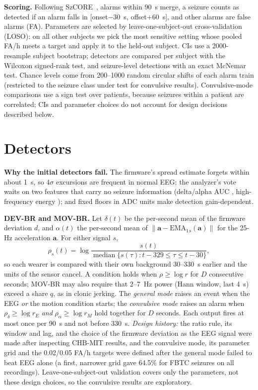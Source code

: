 \documentclass[conference,letterpaper]{IEEEtran}
\begin{document}
\textbf{Scoring.} Following SzCORE~\cite{dan2025szcore}, alarms within 90~s merge, a seizure counts as detected if an alarm falls in [onset$-$30~s, offset$+$60~s], and other alarms are false alarms (FA). Parameters are selected by leave-one-subject-out cross-validation (LOSO): on all other subjects we pick the most sensitive setting whose pooled FA/h meets a target and apply it to the held-out subject. CIs use a 2000-resample subject bootstrap; detectors are compared per subject with the Wilcoxon signed-rank test, and seizure-level detections with an exact McNemar test. Chance levels come from 200--1000 random circular shifts of each alarm train (restricted to the seizure class under test for convulsive results). Convulsive-mode comparisons use a sign test over patients, because seizures within a patient are correlated; CIs and parameter choices do not account for design decisions described below.

\section{Detectors}\label{sec:det}
\textbf{Why the initial detectors fail.} The firmware's spread estimate forgets within about 1~s, so 4$\sigma$ excursions are frequent in normal EEG; the analyzer's vote waits on two features that carry no seizure information (delta/alpha AUC \AucDAR{}, high-frequency energy \AucHFE{}); and fixed floors in ADC units make detection gain-dependent.

\textbf{DEV-BR and MOV-BR.} Let $\delta(t)$ be the per-second mean of the firmware deviation $d$, and $\alpha(t)$ the per-second mean of $\lVert \mathbf a - \mathrm{EMA}_{1\,\mathrm s}(\mathbf a)\rVert$ for the 25-Hz acceleration $\mathbf a$. For either signal $s$,
\begin{equation}
\rho_s(t) = \log \frac{s(t)}{\operatorname{median}\{s(\tau): t{-}329 \le \tau \le t{-}30\}},
\end{equation}
so each wearer is compared with their own background 30--330~s earlier and the units of the sensor cancel. A condition holds when $\rho \ge \log r$ for $D$ consecutive seconds; MOV-BR may also require that 2--7~Hz power (Hann window, last 4~s) exceed a share $q$, as in clonic jerking. The \emph{general mode} raises an event when the EEG \emph{or} the motion condition starts; the \emph{convulsive mode} raises an alarm when $\rho_\delta \ge \log r_E$ \emph{and} $\rho_\alpha \ge \log r_M$ hold together for $D$ seconds. Each output fires at most once per 90~s and not before 330~s. \emph{Design history:} the ratio rule, its window and lag, and the choice of the firmware deviation as the EEG signal were made after inspecting CHB-MIT results, and the convulsive mode, its parameter grid and the 0.02/0.05 FA/h targets were defined after the general mode failed to beat EEG alone (a first, narrower grid gave 64.5\% for FBTC seizures on all recordings). Leave-one-subject-out validation covers only the parameters, not these design choices, so the convulsive results are exploratory.
\end{document}
